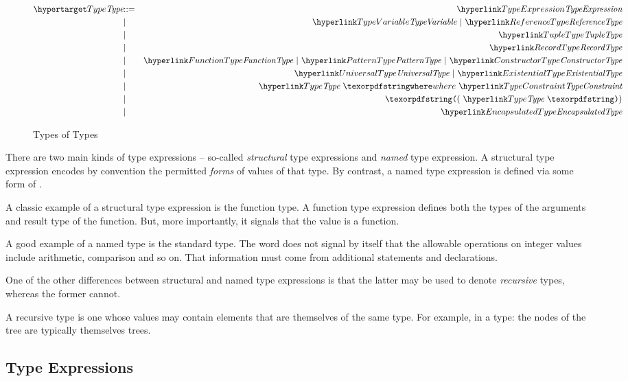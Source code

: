 \begin{figure}[htbp]
\begin{eqnarray*}
\ntDef{Type}&\arrow&\ntRef{TypeExpression}\\
&\choice&\ntRef{TypeVariable}\ \choice\ \ntRef{ReferenceType}\\
&\choice&\ntRef{TupleType}\\
&\choice&\ntRef{RecordType}\\
&\choice&\ntRef{FunctionType}\ \choice\ \ntRef{PatternType}\ \choice\ \ntRef{ConstructorType}\\
&\choice&\ntRef{UniversalType}\ \choice\ \ntRef{ExistentialType}\\
&\choice&\ntRef{Type}\ \q{where}\ \ntRef{TypeConstraint}\\
&\choice&\q{(}\ \ntRef{Type}\ \q{)}\\
&\choice&\ntRef{EncapsulatedType}
\end{eqnarray*}
\caption{Types of Types}
\label{typeFig}
\end{figure}

There are two main kinds of type expressions -- so-called \emph{structural} type expressions and \emph{named} type expression. A structural type expression encodes by convention the permitted \emph{forms} of values of that type. By contrast, a named type expression is defined via some form of .

A classic example of a structural type expression is the function type. A function type expression defines both the types of the arguments and result type of the function. But, more importantly, it signals that the value is a function.

A good example of a named type is the standard  type. The word  does not signal by itself that the allowable operations on integer values include arithmetic, comparison and so on. That information must come from additional statements and declarations. 

One of the other differences between structural and named type expressions is that the latter may be used to denote \emph{recursive} types, whereas the former cannot.

\begin{aside}
A recursive type is one whose values may contain elements that are themselves of the same type. For example, in a  type: the nodes of the tree are typically themselves trees.
\end{aside}

\subsection{Type Expressions}
\label{typeNames}

